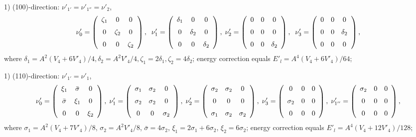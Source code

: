 1) (100)-direction: $\nu'_{1'} = \nu'_{1''} = \nu'_2$, 
\[ \nu'_0 = \left (\begin{array}{ccc}
\zeta_1&0&0\\\noalign{\medskip}0&\zeta_2&0\\\noalign{\medskip}0
&0&\zeta_2\end {array}\right ),\;\;
\nu'_1 = \left (\begin{array}{ccc}
\delta_1&0&0\\\noalign{\medskip}0&\delta_2&0\\\noalign{\medskip}0
&0&\delta_2\end {array}\right ),\;
\nu'_2 = \left (\begin{array}{ccc}
0&0&0\\\noalign{\medskip}0&0&0\\\noalign{\medskip}0
&0&\delta_2\end{array}\right ) ,\;\;
\nu'_3 = \left (\begin{array}{ccc}
0&0&0\\\noalign{\medskip}0&0&\delta_2\\\noalign{\medskip}0
&0&0\end{array}\right ) ,\]
where $\delta_1 = A^2(V_4 + 6V'_4)/4,
\delta_2 = A^2V'_4/4, \zeta_1 = 2\delta_1, \zeta_2 = 4\delta_2$; 
energy correction equals $E'_l = A^4(V_4 + 6V'_4)/64$;  

1) (110)-direction: $\nu'_{1'} = \nu'_1$, 
\[ \nu'_0 = \left (\begin{array}{ccc}
\xi_1&\bar{\sigma}&0\\\noalign{\medskip}\bar{\sigma}
&\xi_1&0\\\noalign{\medskip}0
&0&\xi_2\end {array}\right ),\;
\nu'_1 = \left (\begin{array}{ccc}
\sigma_1&\sigma_2&0\\\noalign{\medskip}\sigma_2&\sigma_2&0\\\noalign{\medskip}0
&0&\sigma_2\end {array}\right ),\;
\nu'_2 = \left (\begin{array}{ccc}
\sigma_2&\sigma_2&0\\\noalign{\medskip}0&0&0\\\noalign{\medskip}\sigma_1
&\sigma_2&\sigma_2\end{array}\right ),\;
\nu'_3 = \left (\begin{array}{ccc}
0&0&0\\\noalign{\medskip}\sigma_2&0&0\\\noalign{\medskip}0
&0&0\end{array}\right ),\;
\nu'_{1''} = \left (\begin{array}{ccc}
\sigma_2&0&0\\\noalign{\medskip}0&0&0\\\noalign{\medskip}0
&0&0\end{array}\right ),\] 
where $\sigma_1 = A^2(V_4 + 7V'_4)/8$,
$\sigma_2 = A^2V'_4/8$,  $\bar{\sigma} = 4\sigma_2$, 
$\xi_1 = 2\sigma_1 + 6\sigma_2$, $\xi_2 = 6\sigma_2$; 
energy correction equals $E'_l = A^4(V_4 + 12V'_4)/128$;  

